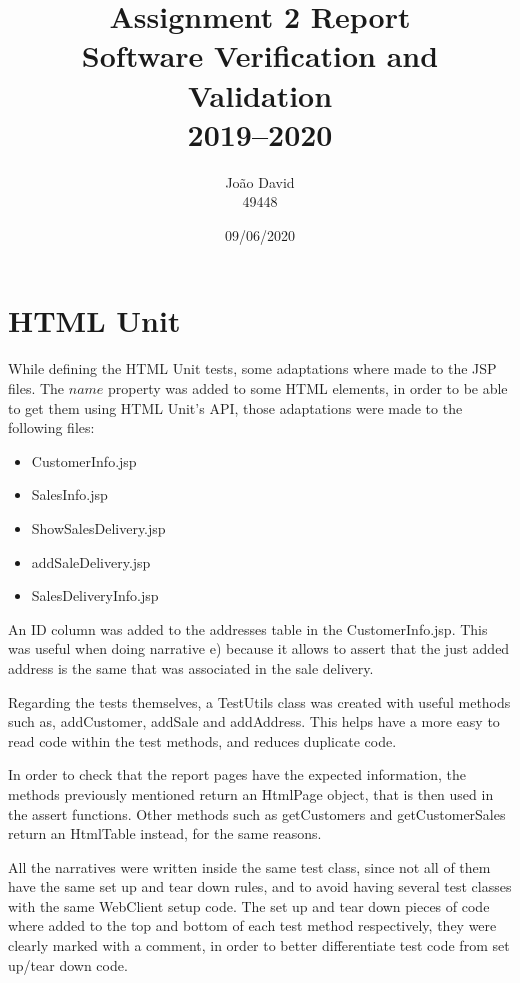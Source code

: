 \documentclass[12pt]{article}
\title{Assignment 2 Report \\
  \Large Software Verification and Validation \\ 2019--2020
}
\author{
  João David\\49448
}
\date{09/06/2020}
\begin{document}
\maketitle

\section{HTML Unit}
While defining the HTML Unit tests, some adaptations where made to the JSP files. The $name$ property was added to some HTML elements, in order to be able to get them using HTML Unit's API, those adaptations were made to the following files:

\begin{itemize}
   \item  CustomerInfo.jsp
   
   \item  SalesInfo.jsp
   
   \item  ShowSalesDelivery.jsp
   
   \item  addSaleDelivery.jsp  
   
   \item  SalesDeliveryInfo.jsp
\end{itemize}
An ID column was added to the addresses table in the CustomerInfo.jsp. This was useful when doing narrative e) because it allows to assert that the just added address is the same that was associated in the sale delivery.

Regarding the tests themselves, a TestUtils class was created with useful methods such as, addCustomer, addSale and addAddress. This helps have a more easy to read code within the test methods, and reduces duplicate code.

In order to check that the report pages have the expected information, the methods previously mentioned return an HtmlPage object, that is then used in the assert functions.
Other methods such as getCustomers and getCustomerSales return an HtmlTable instead, for the same reasons. 

All the narratives were written inside the same test class, since not all of them have the same set up and tear down rules, and to avoid having several test classes with the same WebClient setup code. The set up and tear down pieces of code where added to the top and bottom of each test method respectively, they were clearly marked with a comment, in order to better differentiate test code from set up/tear down code.
\end{document}
